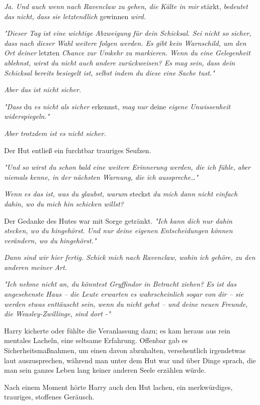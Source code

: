 {\emph{Ja. Und auch wenn nach Ravenclaw zu gehen, die Kälte in mir} stärkt, \emph{bedeutet das nicht, dass sie letztendlich} gewinnen \emph{wird.}

\emph{"Dieser Tag ist eine wichtige Abzweigung für dein Schicksal. Sei nicht so sicher, dass nach dieser Wahl weitere folgen werden. Es gibt kein Warnschild, um den Ort deiner} letzten \emph{Chance zur Umkehr zu markieren. Wenn du eine Gelegenheit ablehnst, wirst du nicht auch andere zurückweisen? Es mag sein, dass dein Schicksal bereits besiegelt ist, selbst indem du diese eine Sache tust."}

\emph{Aber das ist nicht sicher.}

\emph{"Dass} du \emph{es nicht als sicher} erkennst, \emph{mag nur} deine \emph{eigene Unwissenheit widerspiegeln."}

\emph{Aber trotzdem ist es nicht sicher.}

Der Hut entließ ein furchtbar trauriges Seufzen.

\emph{"Und so wirst du schon bald eine weitere Erinnerung werden, die ich fühle, aber niemals kenne, in der nächsten Warnung, die ich ausspreche…"}

\emph{Wenn es das ist, was du glaubst, warum} steckst \emph{du mich dann nicht einfach dahin, wo du mich hin schicken willst?}

Der Gedanke des Hutes war mit Sorge getränkt. \emph{"Ich kann dich nur dahin stecken, wo du hingehörst. Und nur deine eigenen Entscheidungen können verändern, wo du hingehörst."}

\emph{Dann sind wir hier fertig. Schick mich nach Ravenclaw, wohin ich gehöre, zu den anderen meiner Art.}

\emph{"Ich nehme nicht an, du könntest Gryffindor in Betracht ziehen? Es ist das angesehenste Haus -- die Leute erwarten es wahrscheinlich sogar von dir -- sie werden etwas enttäuscht sein, wenn du nicht gehst -- und deine neuen Freunde, die Weasley-Zwillinge, sind dort -"}

Harry kicherte oder fühlte die Veranlassung dazu; es kam heraus aus rein mentales Lacheln, eine seltsame Erfahrung. Offenbar gab es Sicherheitsmaßnahmen, um einen davon abzuhalten, versehentlich irgendetwas laut auszusprechen, während man unter dem Hut war und über Dinge sprach, die man sein ganzes Leben lang keiner anderen Seele erzählen würde.

Nach einem Moment hörte Harry auch den Hut lachen, ein merkwürdiges, trauriges, stoffenes Geräusch.

}
